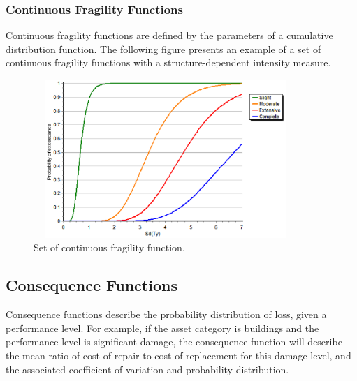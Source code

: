 \subsubsection{Continuous Fragility Functions}
Continuous fragility functions are defined by the parameters of a cumulative distribution function. The following figure presents an example of a set of continuous fragility functions with a structure-dependent intensity measure.

\begin{figure}[ht]
\centering
\includegraphics[width=10cm,height=6cm]{./Figures/Part_Risk/FFContinuous.eps}
\caption{Set of continuous fragility function.}
\label{FFcontinuous}
\end{figure}

\subsection{Consequence Functions}
Consequence functions describe the probability distribution of loss, given a performance level. For example, if the asset category is buildings and the performance level is significant damage, the consequence function will describe the mean ratio of cost of repair to cost of replacement for this damage level, and the associated coefficient of variation and probability distribution.
